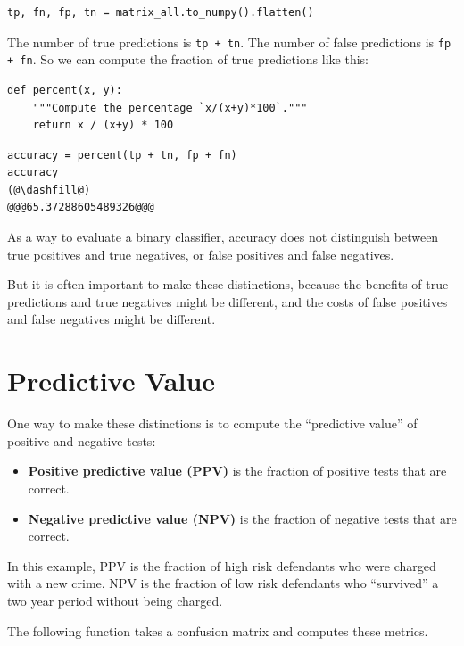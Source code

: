 \begin{lstlisting}[]
tp, fn, fp, tn = matrix_all.to_numpy().flatten()
\end{lstlisting}

The number of true predictions is \passthrough{\lstinline!tp + tn!}. The
number of false predictions is \passthrough{\lstinline!fp + fn!}. So we
can compute the fraction of true predictions like this:

\begin{lstlisting}[]
def percent(x, y):
    """Compute the percentage `x/(x+y)*100`."""
    return x / (x+y) * 100
\end{lstlisting}

\begin{lstlisting}[]
accuracy = percent(tp + tn, fp + fn)
accuracy
(@\dashfill@)
@@@65.37288605489326@@@
\end{lstlisting}

As a way to evaluate a binary classifier, accuracy does not distinguish
between true positives and true negatives, or false positives and false
negatives.

But it is often important to make these distinctions, because the
benefits of true predictions and true negatives might be different, and
the costs of false positives and false negatives might be different.

\hypertarget{predictive-value}{%
\section{Predictive Value}\label{predictive-value}}

One way to make these distinctions is to compute the ``predictive
value'' of positive and negative tests:

\begin{itemize}
\item
  \textbf{Positive predictive value (PPV)} is the fraction of positive
  tests that are correct.
\item
  \textbf{Negative predictive value (NPV)} is the fraction of negative
  tests that are correct.
\end{itemize}

In this example, PPV is the fraction of high risk defendants who were
charged with a new crime. NPV is the fraction of low risk defendants who
``survived'' a two year period without being charged.

The following function takes a confusion matrix and computes these
metrics.

